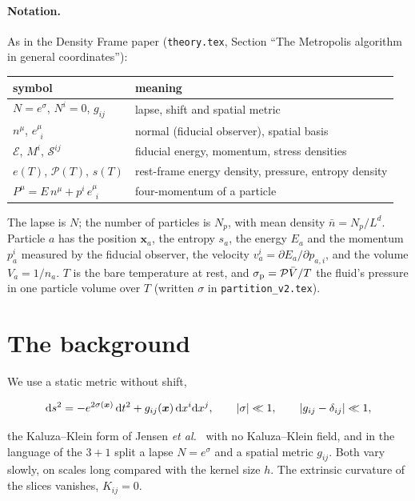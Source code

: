 \documentclass[11pt,aps,preprint,nofootinbib,superscriptaddress,tightenlines]{revtex4-2}
\def\edense{{\mathcal{E}}}
\def\pdense{M}
\def\Sstress{{\mathcal S}}
\def\pr{{\mathcal P}}
\def\er{e}
\def\dd{{\rm d}}
\newcommand{\ve}[2]{e_{\;\,#1}^{#2}}
\def\st{\begin{equation}}
\def\stp{\end{equation}}
\let\oldparagraph\paragraph
\renewcommand{\paragraph}{\par\bigskip\oldparagraph}
\begin{document}
\paragraph{Notation.}  As in the Density Frame paper \cite{densityframe} (\texttt{theory.tex}, Section ``The Metropolis algorithm in general coordinates''):
\begin{center}
\begin{tabular}{ll}
\toprule
symbol & meaning \\
\midrule
$N=e^{\sigma}$, $N^i=0$, $g_{ij}$ & lapse, shift and spatial metric \\
$n^\mu$, $\ve{i}{\mu}$ & normal (fiducial observer), spatial basis \\
$\edense$, $\pdense^i$, $\Sstress^{ij}$ & fiducial energy, momentum, stress densities \\
$\er(T)$, $\pr(T)$, $s(T)$ & rest-frame energy density, pressure, entropy density \\
$P^\mu=E\,n^\mu+p^i\,\ve{i}{\mu}$ & four-momentum of a particle \\
\bottomrule
\end{tabular}
\end{center}
The lapse is $N$; the number of particles is $N_p$, with mean density $\bar n=N_p/L^d$.  Particle $a$ has the position $\bm x_a$, the entropy $s_a$, the energy $E_a$ and
the momentum $p_a^i$ measured by the fiducial observer, the velocity $v_a^i=\partial E_a/\partial p_{a,i}$, and the volume $V_a=1/n_a$.  $T$ is the bare temperature at
rest, and $\sigma_{\rm p}=\pr\bar V/T$ the fluid's pressure in one particle volume over $T$ (written $\sigma$ in \texttt{partition\_v2.tex}).

\section{The background}
\label{sec:background}

We use a static metric without shift,
\begin{keyeq}
\st
\dd s^2=-e^{2\sigma(\bm x)}\,\dd t^2+g_{ij}(\bm x)\,\dd x^i\dd x^j,\qquad |\sigma|\ll1,\qquad |g_{ij}-\delta_{ij}|\ll1 ,
\label{metric}
\stp
\end{keyeq}
the Kaluza--Klein form of Jensen \emph{et al.}\ \cite{Jensen:2012jh} with no Kaluza--Klein field, and in the language of the $3+1$ split a lapse $N=e^\sigma$ and a spatial
metric $g_{ij}$.  Both vary slowly, on scales long compared with the kernel size $h$.  The extrinsic curvature of the slices vanishes, $K_{ij}=0$.
\end{document}
